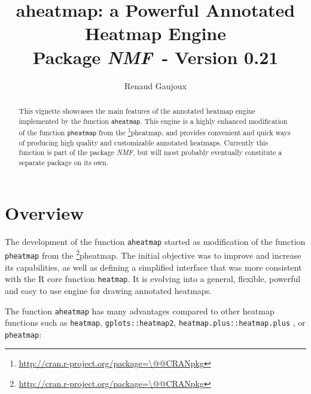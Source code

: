\documentclass[a4paper]{article}\usepackage[]{graphicx}\usepackage[]{color}
\makeatletter
\let\code=\texttt
\newcommand{\pkgname}[1]{\textit{#1}\xspace}
\newcommand{\CRANurl}[1]{\url{http://cran.r-project.org/package=#1}}
\def\CRANpkg{\@ifstar\@CRANpkg\@@CRANpkg}
\def\@CRANpkg#1{\href{http://cran.r-project.org/package=#1}{\pkgname{#1}}\footnote{\CRANurl{#1}}}
\def\@@CRANpkg#1{\href{http://cran.r-project.org/package=#1}{\pkgname{#1}} package\footnote{\CRANurl{#1}}}
\newcommand{\nmfpack}{\pkgname{NMF}}
\makeatother
\begin{document}
\title{aheatmap: a Powerful Annotated Heatmap Engine\\
\small Package \nmfpack\ - Version 0.21}
\author{Renaud Gaujoux}

\maketitle

\begin{abstract}
This vignette showcases the main features of the annotated heatmap engine
implemented by the function \code{aheatmap}.
This engine is a highly enhanced modification of the function \code{pheatmap}
from the \CRANpkg{pheatmap}, and provides convenient and quick ways of producing high quality and customizable annotated heatmaps.
Currently this function is part of the package \nmfpack, but will most
probably eventually constitute a separate package on its own.
\end{abstract}

{\small \tableofcontents}

\section{Overview}

The development of the function \code{aheatmap} started as modification of the
function \code{pheatmap} from the \CRANpkg{pheatmap}. 
The initial objective was to improve and increase its capabilities, as well as 
defining a simplified interface that was more consistent with the R core
function \code{heatmap}.
It is evolving into a general, flexible, powerful and easy to use engine for
drawing annotated heatmaps.
  
The function \code{aheatmap} has many advantages compared to other heatmap functions 
such as \code{heatmap}, \code{gplots::heatmap2}, \code{heatmap.plus::heatmap.plus} 
, or \code{pheatmap}:
\end{document}
